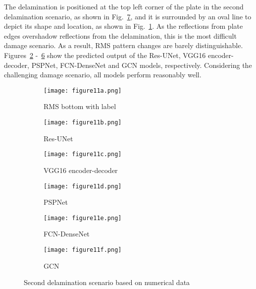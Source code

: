 The delamination is positioned at the top left corner of the plate in the second delamination scenario, as shown in Fig.~\ref{fig:385_softmax}, and it is surrounded by an oval line to depict its shape and location, as shown in Fig.~\ref{fig:RMS_flat_shell_Vz_385}.
As the reflections from plate edges overshadow reflections from the delamination, this is the most difficult damage scenario.
As a result, RMS pattern changes are barely distinguishable.
Figures~\ref{fig:Unet_Pred__softmax_385} -~\ref{fig:gcn_pred_385} show the predicted output of the Res-UNet, VGG16 encoder-decoder, PSPNet, FCN-DenseNet and GCN models, respectively.
Considering the challenging damage scenario, all models perform reasonably well.
\begin{figure}[!h]
	\centering
	\begin{subfigure}[b]{0.47\textwidth}
		\centering
		\texttt{[image: figure11a.png]}
		\caption{RMS bottom with label}
		\label{fig:RMS_flat_shell_Vz_385}
	\end{subfigure}
	\hfill
	\begin{subfigure}[b]{0.47\textwidth}
		\centering
		\texttt{[image: figure11b.png]}
		\caption{Res-UNet}
		\label{fig:Unet_Pred__softmax_385}
	\end{subfigure}
	\hfill
	\begin{subfigure}[b]{0.47\textwidth}
		\centering
		\texttt{[image: figure11c.png]}
		\caption{VGG16 encoder-decoder}			\label{fig:vgg16_pred__softmax_385}			
	\end{subfigure}
	\hfill
	\begin{subfigure}[b]{0.47\textwidth}
		\centering
		\texttt{[image: figure11d.png]}
		\caption{PSPNet}
		\label{fig:pspnet_pred__softmax_385}
	\end{subfigure}	
	\hfill
	\begin{subfigure}[b]{0.47\textwidth}
		\centering
		\texttt{[image: figure11e.png]}
		\caption{FCN-DenseNet}
		\label{fig:fcn_densenet_pred__softmax_385}
	\end{subfigure}	
	\hfill
	\begin{subfigure}[b]{0.47\textwidth}
		\centering
		\texttt{[image: figure11f.png]}
		\caption{GCN}
		\label{fig:gcn_pred_385}
	\end{subfigure}
	\caption{Second delamination scenario based on numerical data}
	\label{fig:385_softmax}
\end{figure}
\clearpage


